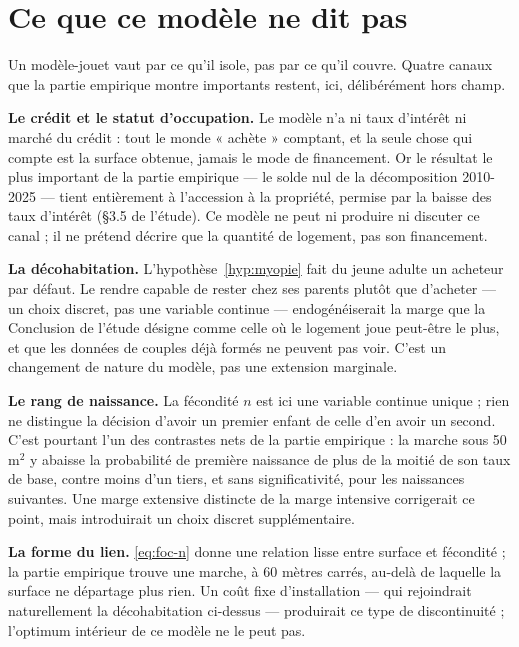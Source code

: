 \documentclass[11pt,a4paper]{article}
\theoremstyle{plain}
\theoremstyle{definition}
\begin{document}
\section{Ce que ce modèle ne dit pas}\label{sec:limites}

Un modèle-jouet vaut par ce qu'il isole, pas par ce qu'il couvre. Quatre canaux que la partie empirique montre importants restent, ici, délibérément hors champ.

\textbf{Le crédit et le statut d'occupation.} Le modèle n'a ni taux d'intérêt ni marché du crédit : tout le monde « achète » comptant, et la seule chose qui compte est la surface obtenue, jamais le mode de financement. Or le résultat le plus important de la partie empirique — le solde nul de la décomposition 2010-2025 — tient entièrement à l'accession à la propriété, permise par la baisse des taux d'intérêt (§3.5 de l'étude). Ce modèle ne peut ni produire ni discuter ce canal ; il ne prétend décrire que la quantité de logement, pas son financement.

\textbf{La décohabitation.} L'hypothèse~\ref{hyp:myopie} fait du jeune adulte un acheteur par défaut. Le rendre capable de rester chez ses parents plutôt que d'acheter — un choix discret, pas une variable continue — endogénéiserait la marge que la Conclusion de l'étude désigne comme celle où le logement joue peut-être le plus, et que les données de couples déjà formés ne peuvent pas voir. C'est un changement de nature du modèle, pas une extension marginale.

\textbf{Le rang de naissance.} La fécondité $n$ est ici une variable continue unique ; rien ne distingue la décision d'avoir un premier enfant de celle d'en avoir un second. C'est pourtant l'un des contrastes nets de la partie empirique : la marche sous 50 m$^2$ y abaisse la probabilité de première naissance de plus de la moitié de son taux de base, contre moins d'un tiers, et sans significativité, pour les naissances suivantes. Une marge extensive distincte de la marge intensive corrigerait ce point, mais introduirait un choix discret supplémentaire.

\textbf{La forme du lien.} \eqref{eq:foc-n} donne une relation lisse entre surface et fécondité ; la partie empirique trouve une marche, à 60 mètres carrés, au-delà de laquelle la surface ne départage plus rien. Un coût fixe d'installation — qui rejoindrait naturellement la décohabitation ci-dessus — produirait ce type de discontinuité ; l'optimum intérieur de ce modèle ne le peut pas.
\end{document}
